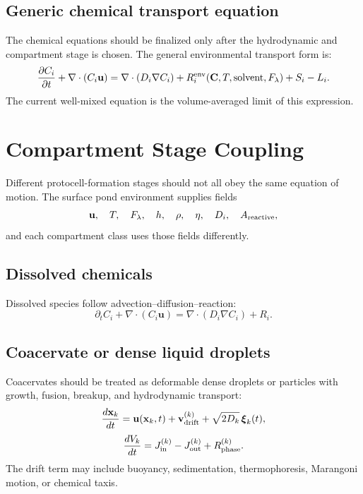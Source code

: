 \documentclass[11pt]{article}
\begin{document}
\subsection{Generic chemical transport equation}

The chemical equations should be finalized only after the hydrodynamic and
compartment stage is chosen. The general environmental transport form is:
\begin{equation}
\frac{\partial C_i}{\partial t}
+
\nabla\cdot(C_i\mathbf{u})
=
\nabla\cdot(D_i\nabla C_i)
+
R_i^{\rm env}(\mathbf{C},T,\mathrm{solvent},F_{\lambda})
+
S_i
-
L_i.
\end{equation}
The current well-mixed equation is the volume-averaged limit of this expression.

\section{Compartment Stage Coupling}

Different protocell-formation stages should not all obey the same equation of
motion. The surface pond environment supplies fields
\begin{equation}
\mathbf{u},\quad T,\quad F_{\lambda},\quad h,\quad \rho,\quad \eta,\quad
D_i,\quad A_{\rm reactive},
\end{equation}
and each compartment class uses those fields differently.

\subsection{Dissolved chemicals}

Dissolved species follow advection--diffusion--reaction:
\begin{equation}
\partial_t C_i+\nabla\cdot(C_i\mathbf{u})
=
\nabla\cdot(D_i\nabla C_i)+R_i.
\end{equation}

\subsection{Coacervate or dense liquid droplets}

Coacervates should be treated as deformable dense droplets or particles with
growth, fusion, breakup, and hydrodynamic transport:
\begin{equation}
\frac{d\mathbf{x}_k}{dt}
=
\mathbf{u}(\mathbf{x}_k,t)
+
\mathbf{v}_{\rm drift}^{(k)}
+
\sqrt{2D_k}\,\boldsymbol{\xi}_k(t),
\end{equation}
\begin{equation}
\frac{dV_k}{dt}
=
J_{\rm in}^{(k)}-J_{\rm out}^{(k)}+R_{\rm phase}^{(k)}.
\end{equation}
The drift term may include buoyancy, sedimentation, thermophoresis,
Marangoni motion, or chemical taxis.
\end{document}
